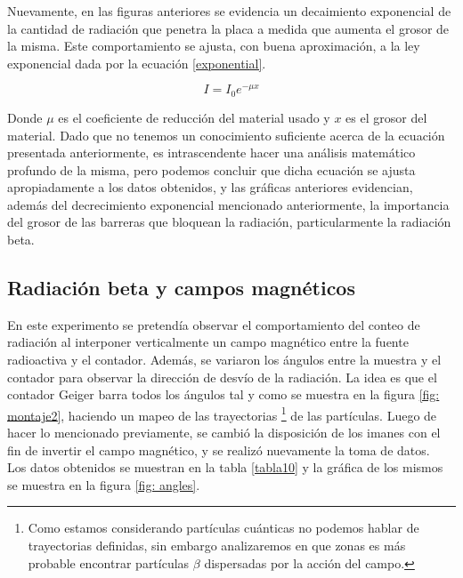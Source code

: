 \documentclass[prb,aps,twocolumn,preprintnumbers,amsmath,amssymb]{revtex4}
\begin{document}
Nuevamente, en las figuras anteriores se evidencia un decaimiento exponencial de la cantidad de radiación que penetra la placa a medida que aumenta el grosor de la misma. Este comportamiento se ajusta, con buena aproximación, a la ley exponencial dada por la ecuación \eqref{exponential}.

\begin{equation}
\label{exponential}
I = I_{0}e^{-\mu x}
\end{equation}

Donde $\mu$ es el coeficiente de reducción del material usado y $x$ es el grosor del material. Dado que no tenemos un conocimiento suficiente acerca de la ecuación presentada anteriormente, es intrascendente hacer una análisis matemático profundo de la misma, pero podemos concluir que dicha ecuación se ajusta apropiadamente a los datos obtenidos, y las gráficas anteriores evidencian, además del decrecimiento exponencial  mencionado anteriormente, la importancia del grosor de las barreras que bloquean la radiación, particularmente la radiación beta.

\subsection{Radiación beta y campos magnéticos}

En este experimento se pretendía observar el comportamiento del conteo de radiación al interponer verticalmente un campo magnético entre la fuente radioactiva y el contador. Además, se variaron los ángulos entre la muestra y el contador para observar la dirección de desvío de la radiación. La idea es que el contador Geiger barra todos los ángulos tal y como se muestra en la figura \ref{fig: montaje2}, haciendo un mapeo de las trayectorias \footnote{Como estamos considerando partículas cuánticas no podemos hablar de trayectorias definidas, sin embargo analizaremos en que zonas es más probable encontrar partículas $\beta$ dispersadas por la acción del campo.} de las partículas. Luego de hacer lo mencionado previamente, se cambió la disposición de los imanes con el fin de invertir el campo magnético, y se realizó nuevamente la toma de datos.\\



Los datos obtenidos se muestran en la tabla \ref{tabla10} y la gráfica de los mismos se muestra en la figura \ref{fig: angles}.\\
\end{document}
